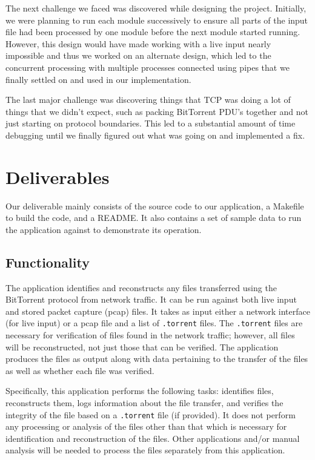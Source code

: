 \documentclass{acm_proc_article-sp}
\begin{document}
The next challenge we faced was discovered while designing the project.
Initially, we were planning to run each module successively to ensure all parts
of the input file had been processed by one module before the next module
started running. However, this design would have made working with a live input
nearly impossible and thus we worked on an alternate design, which led to the
concurrent processing with multiple processes connected using pipes that we
finally settled on and used in our implementation.

The last major challenge was discovering things that TCP was doing a lot of
things that we didn't expect, such as packing BitTorrent PDU's together and not
just starting on protocol boundaries.  This led to a substantial amount of time
debugging until we finally figured out what was going on and implemented a fix.

\section{Deliverables}
Our deliverable mainly consists of the source code to our application, a
Makefile to build the code, and a README. It also contains a set of sample data
to run the application against to demonstrate its operation.

\subsection{Functionality}
The application identifies and reconstructs any files transferred using the
BitTorrent protocol from network traffic. It can be run against both live input
and stored packet capture (pcap) files. It takes as input either a network
interface (for live input) or a pcap file and a list of \texttt{.torrent}
files. The \texttt{.torrent} files are necessary for verification of files found
in the network traffic; however, all files will be reconstructed, not just those
that can be verified. The application produces the files as output along with
data pertaining to the transfer of the files as well as whether each file was
verified.

Specifically, this application performs the following tasks: identifies files,
reconstructs them, logs information about the file transfer, and verifies the
integrity of the file based on a \texttt{.torrent} file (if provided). It does
not perform any processing or analysis of the files other than that which is
necessary for identification and reconstruction of the files. Other applications
and/or manual analysis will be needed to process the files separately from this
application.
\end{document}
